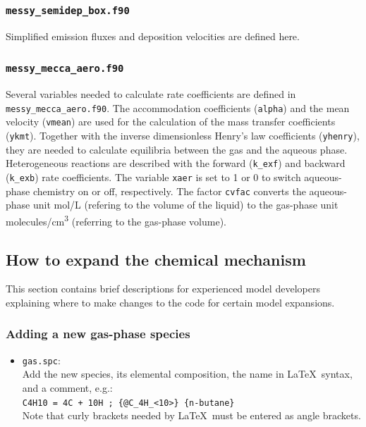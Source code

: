 \documentclass[twoside]{article}
\def\nosep{\setlength\parsep{0mm}\setlength\topsep{0mm}\setlength\itemsep{0mm}}
\begin{document}
\subsubsection{{\tt messy\_semidep\_box.f90}}

Simplified emission fluxes and deposition velocities are defined here.

\subsubsection{{\tt messy\_mecca\_aero.f90}}

Several variables needed to calculate rate coefficients are defined in
\verb|messy_mecca_aero.f90|. The accommodation coefficients
(\verb|alpha|) and the mean velocity (\verb|vmean|) are used for the
calculation of the mass transfer coefficients (\verb|ykmt|). Together
with the inverse dimensionless Henry's law coefficients (\verb|yhenry|),
they are needed to calculate equilibria between the gas and the aqueous
phase. Heterogeneous reactions are described with the forward
(\verb|k_exf|) and backward (\verb|k_exb|) rate coefficients. The
variable \verb|xaer| is set to 1 or 0 to switch aqueous-phase chemistry
on or off, respectively. The factor \verb|cvfac| converts the
aqueous-phase unit \unit{mol/L} (refering to the volume of the liquid)
to the gas-phase unit \unit{molecules/cm^3} (referring to the gas-phase
volume).

\subsection{How to expand the chemical mechanism}

This section contains brief descriptions for experienced model
developers explaining where to make changes to the code for certain
model expansions.

\subsubsection{Adding a new gas-phase species}

\begin{itemize}\nosep
\item \verb|gas.spc|:\\
  Add the new species, its elemental composition,
  the name in La\TeX\ syntax, and a comment, e.g.:\\
  \verb|C4H10 = 4C + 10H ; {@C_4H_<10>} {n-butane}|\\
  Note that curly brackets needed by La\TeX\ must be entered as angle
  brackets.
\end{itemize}
\end{document}
